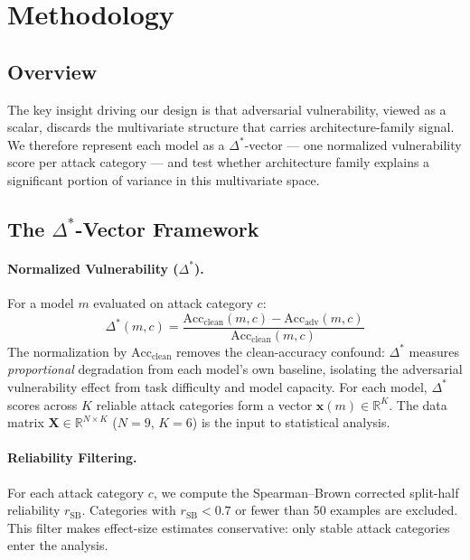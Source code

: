\section{Methodology}
\label{sec:method}

\subsection{Overview}

The key insight driving our design is that adversarial vulnerability, viewed as a scalar, discards
the multivariate structure that carries architecture-family signal. We therefore represent each
model as a $\Delta^*$-vector --- one normalized vulnerability score per attack category --- and
test whether architecture family explains a significant portion of variance in this multivariate
space.

\subsection{The $\Delta^*$-Vector Framework}

\paragraph{Normalized Vulnerability ($\Delta^*$).}
For a model $m$ evaluated on attack category $c$:
\begin{equation}
\Delta^*(m, c) = \frac{\text{Acc}_\text{clean}(m, c) - \text{Acc}_\text{adv}(m, c)}{\text{Acc}_\text{clean}(m, c)}
\end{equation}
The normalization by $\text{Acc}_\text{clean}$ removes the clean-accuracy confound: $\Delta^*$
measures \emph{proportional} degradation from each model's own baseline, isolating the adversarial
vulnerability effect from task difficulty and model capacity. For each model, $\Delta^*$ scores
across $K$ reliable attack categories form a vector $\mathbf{x}(m) \in \mathbb{R}^K$. The data
matrix $\mathbf{X} \in \mathbb{R}^{N \times K}$ ($N=9$, $K=6$) is the input to statistical
analysis.

\paragraph{Reliability Filtering.}
For each attack category $c$, we compute the Spearman--Brown corrected split-half reliability
$r_\text{SB}$. Categories with $r_\text{SB} < 0.7$ or fewer than 50 examples are excluded.
This filter makes effect-size estimates conservative: only stable attack categories enter the
analysis.

